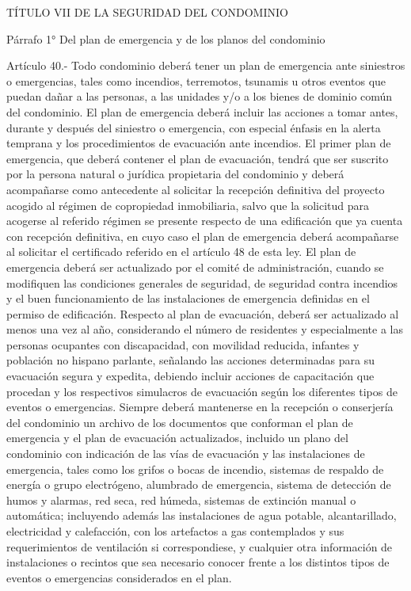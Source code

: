     TÍTULO VII
    DE LA SEGURIDAD DEL CONDOMINIO


    Párrafo 1°
    Del plan de emergencia y de los planos del condominio

     
    Artículo 40.- Todo condominio deberá tener un plan de emergencia ante siniestros o emergencias, tales como incendios, terremotos, tsunamis u otros eventos que puedan dañar a las personas, a las unidades y/o a los bienes de dominio común del condominio. El plan de emergencia deberá incluir las acciones a tomar antes, durante y después del siniestro o emergencia, con especial énfasis en la alerta temprana y los procedimientos de evacuación ante incendios.
    El primer plan de emergencia, que deberá contener el plan de evacuación, tendrá que ser suscrito por la persona natural o jurídica propietaria del condominio y deberá acompañarse como antecedente al solicitar la recepción definitiva del proyecto acogido al régimen de copropiedad inmobiliaria, salvo que la solicitud para acogerse al referido régimen se presente respecto de una edificación que ya cuenta con recepción definitiva, en cuyo caso el plan de emergencia deberá acompañarse al solicitar el certificado referido en el artículo 48 de esta ley.
    El plan de emergencia deberá ser actualizado por el comité de administración, cuando se modifiquen las condiciones generales de seguridad, de seguridad contra incendios y el buen funcionamiento de las instalaciones de emergencia definidas en el permiso de edificación.
    Respecto al plan de evacuación, deberá ser actualizado al menos una vez al año, considerando el número de residentes y especialmente a las personas ocupantes con discapacidad, con movilidad reducida, infantes y población no hispano parlante, señalando las acciones determinadas para su evacuación segura y expedita, debiendo incluir acciones de capacitación que procedan y los respectivos simulacros de evacuación según los diferentes tipos de eventos o emergencias.
    Siempre deberá mantenerse en la recepción o conserjería del condominio un archivo de los documentos que conforman el plan de emergencia y el plan de evacuación actualizados, incluido un plano del condominio con indicación de las vías de evacuación y las instalaciones de emergencia, tales como los grifos o bocas de incendio, sistemas de respaldo de energía o grupo electrógeno, alumbrado de emergencia, sistema de detección de humos y alarmas, red seca, red húmeda, sistemas de extinción manual o automática; incluyendo además las instalaciones de agua potable, alcantarillado, electricidad y calefacción, con los artefactos a gas contemplados y sus requerimientos de ventilación si correspondiese, y cualquier otra información de instalaciones o recintos que sea necesario conocer frente a los distintos tipos de eventos o emergencias considerados en el plan.

